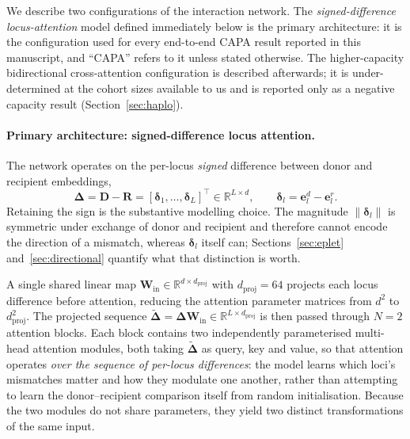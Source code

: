 \documentclass[11pt,a4paper]{article}
\begin{document}
We describe two configurations of the interaction network.  The
\emph{signed-difference locus-attention} model defined immediately below is
the primary architecture: it is the configuration used for every end-to-end
CAPA result reported in this manuscript, and ``CAPA'' refers to it unless
stated otherwise.  The higher-capacity bidirectional cross-attention
configuration is described afterwards; it is under-determined at the cohort
sizes available to us and is reported only as a negative capacity result
(Section~\ref{sec:haplo}).

\paragraph{Primary architecture: signed-difference locus attention.}
The network operates on the per-locus \emph{signed} difference between donor
and recipient embeddings,
\begin{equation}
  \boldsymbol{\Delta} = \mathbf{D} - \mathbf{R}
  = [\boldsymbol{\delta}_1, \ldots, \boldsymbol{\delta}_L]^\top
  \in \mathbb{R}^{L \times d},
  \qquad
  \boldsymbol{\delta}_l = \mathbf{e}^d_l - \mathbf{e}^r_l .
  \label{eq:signed_diff}
\end{equation}
Retaining the sign is the substantive modelling choice.  The magnitude
$\lVert \boldsymbol{\delta}_l \rVert$ is symmetric under exchange of donor and
recipient and therefore cannot encode the direction of a mismatch, whereas
$\boldsymbol{\delta}_l$ itself can; Sections~\ref{sec:eplet}
and~\ref{sec:directional} quantify what that distinction is worth.

A single shared linear map $\mathbf{W}_{\mathrm{in}} \in
\mathbb{R}^{d \times d_{\mathrm{proj}}}$ with $d_{\mathrm{proj}} = 64$
projects each locus difference before attention, reducing the attention
parameter matrices from $d^2$ to $d_{\mathrm{proj}}^2$.  The projected
sequence $\tilde{\boldsymbol{\Delta}} = \boldsymbol{\Delta}
\mathbf{W}_{\mathrm{in}} \in \mathbb{R}^{L \times d_{\mathrm{proj}}}$ is then
passed through $N = 2$ attention blocks.  Each block contains two independently
parameterised multi-head attention modules, both taking
$\tilde{\boldsymbol{\Delta}}$ as query, key and value, so that attention
operates \emph{over the sequence of per-locus differences}: the model learns
which loci's mismatches matter and how they modulate one another, rather than
attempting to learn the donor--recipient comparison itself from random
initialisation.  Because the two modules do not share parameters, they yield
two distinct transformations of the same input.
\end{document}
